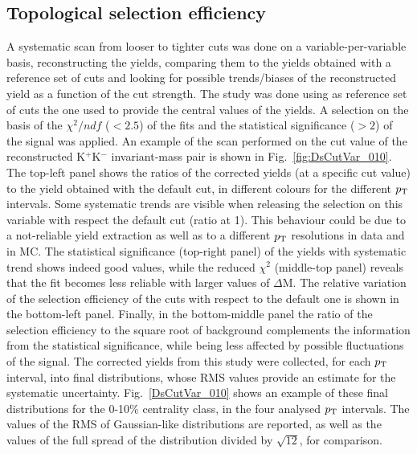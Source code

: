 \subsection{Topological selection efficiency}
\label{sec:CutVarsystAA}
A systematic scan from looser to tighter cuts was done on a variable-per-variable 
basis, reconstructing the yields, comparing them to the yields obtained 
with a reference set of cuts and looking for possible trends/biases of 
the reconstructed yield as a function of the cut strength.
The study was done using as reference set of cuts the one used 
to provide the central values of the yields. A selection
on the basis of the $\chi^2/ndf$ ($<2.5$) of the fits and the statistical significance ($>2$)
of the signal was applied.  
An example of the scan performed on the cut value of the
reconstructed K$^+$K$^-$ invariant-mass pair is shown in Fig.~\ref{fig:DsCutVar_010}.
The top-left panel shows the ratios of the corrected yields 
(at a specific cut value) to the yield obtained with the default
cut, in different colours for the different $p_{\rm T}$ intervals.
Some systematic trends are visible when releasing the selection
on this variable with respect the default cut (ratio at 1). 
This behaviour could be due to a not-reliable yield
extraction as well as to a different $p_{\rm T}$ resolutions in data and in MC.
The statistical significance (top-right panel) of the yields with systematic trend shows indeed good
values, while the reduced $\chi^2$ (middle-top panel) reveals that the fit becomes
less reliable with larger values of $\Delta$M. The relative variation of the selection
efficiency of the cuts with respect to the default one is shown in the bottom-left panel.
Finally, in the bottom-middle panel the ratio of the selection efficiency to the square root of 
background complements the information from the statistical significance,
while being less affected by possible fluctuations of the signal.
The corrected yields from this study were collected, for each $p_{\rm T}$ interval,
into final distributions, whose RMS values provide an estimate for the systematic uncertainty.
Fig.~\ref{DsCutVar_010} shows an example of these final distributions 
for the 0-10\% centrality class, in the four analysed $p_{\rm T}$ intervals. 
The values of the RMS of Gaussian-like distributions are reported, as well as
the values of the full spread of the distribution divided by $\sqrt{12}$,
for comparison.

